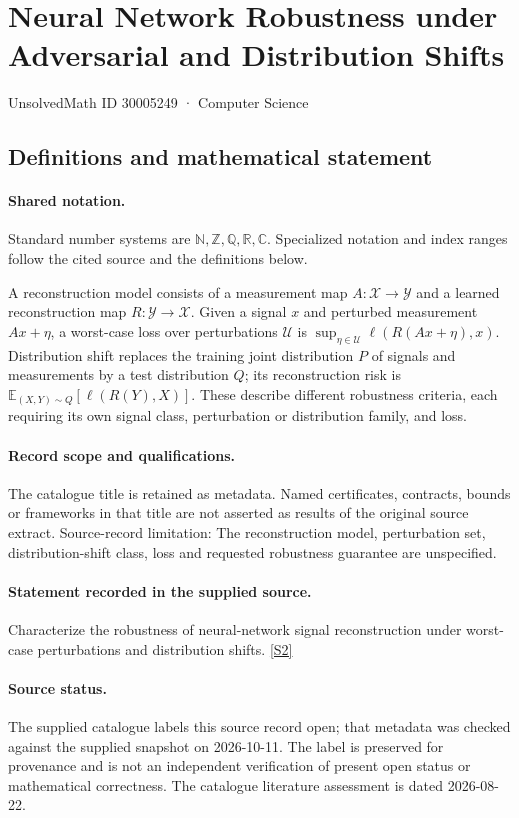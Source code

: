\documentclass[11pt]{article}
\newcommand{\sref}[2]{\hyperlink{source:#1:#2}{[S#2]}}
\begin{document}
\setcounter{section}{30005248}
\section{Neural Network Robustness under Adversarial and Distribution Shifts}\label{30005249}
{\small\sffamily UnsolvedMath ID 30005249 · Computer Science}
\subsection{Definitions and mathematical statement}

\paragraph{Shared notation.}Standard number systems are $\mathbb N,\mathbb Z,\mathbb Q,\mathbb R,\mathbb C$. Specialized notation and index ranges follow the cited source and the definitions below.


A reconstruction model consists of a measurement map $A:\mathcal X\to\mathcal Y$ and a learned reconstruction map $R:\mathcal Y\to\mathcal X$. Given a signal $x$ and perturbed measurement $Ax+\eta$, a worst-case loss over perturbations $\mathcal U$ is $\sup_{\eta\in\mathcal U}\ell(R(Ax+\eta),x)$. Distribution shift replaces the training joint distribution $P$ of signals and measurements by a test distribution $Q$; its reconstruction risk is $\mathbb E_{(X,Y)\sim Q}[\ell(R(Y),X)]$. These describe different robustness criteria, each requiring its own signal class, perturbation or distribution family, and loss.
\paragraph{Record scope and qualifications.}
The catalogue title is retained as metadata. Named certificates, contracts, bounds or frameworks in that title are not asserted as results of the original source extract.
Source-record limitation: The reconstruction model, perturbation set, distribution-shift class, loss and requested robustness guarantee are unspecified.
\paragraph{Statement recorded in the supplied source.}
Characterize the robustness of neural-network signal reconstruction under worst-case perturbations and distribution shifts. \sref{30005249}{2}
\paragraph{Source status.}
The supplied catalogue labels this source record open; that metadata was checked against the supplied snapshot on 2026-10-11. The label is preserved for provenance and is not an independent verification of present open status or mathematical correctness. The catalogue literature assessment is dated 2026-08-22.
\end{document}

